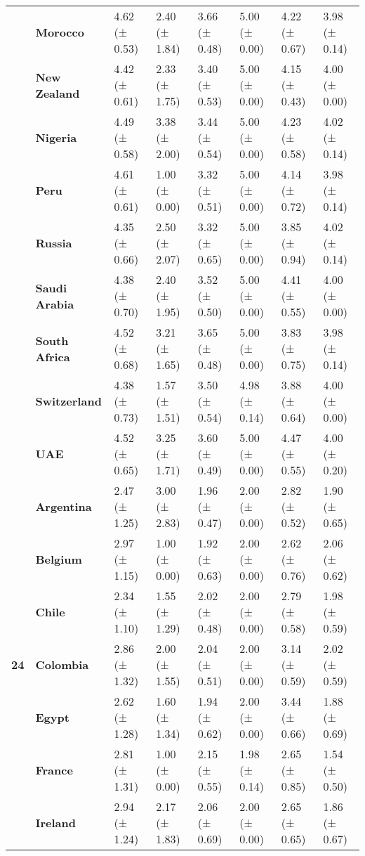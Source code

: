 \begin{longtable}{llllllll}
\textbf{} & \textbf{Morocco} & 4.62 (± 0.53) & 2.40 (± 1.84) & 3.66 (± 0.48) & 5.00 (± 0.00) & 4.22 (± 0.67) & 3.98 (± 0.14) \\
\textbf{} & \textbf{New Zealand} & 4.42 (± 0.61) & 2.33 (± 1.75) & 3.40 (± 0.53) & 5.00 (± 0.00) & 4.15 (± 0.43) & 4.00 (± 0.00) \\
\textbf{} & \textbf{Nigeria} & 4.49 (± 0.58) & 3.38 (± 2.00) & 3.44 (± 0.54) & 5.00 (± 0.00) & 4.23 (± 0.58) & 4.02 (± 0.14) \\
\textbf{} & \textbf{Peru} & 4.61 (± 0.61) & 1.00 (± 0.00) & 3.32 (± 0.51) & 5.00 (± 0.00) & 4.14 (± 0.72) & 3.98 (± 0.14) \\
\textbf{} & \textbf{Russia} & 4.35 (± 0.66) & 2.50 (± 2.07) & 3.32 (± 0.65) & 5.00 (± 0.00) & 3.85 (± 0.94) & 4.02 (± 0.14) \\
\textbf{} & \textbf{Saudi Arabia} & 4.38 (± 0.70) & 2.40 (± 1.95) & 3.52 (± 0.50) & 5.00 (± 0.00) & 4.41 (± 0.55) & 4.00 (± 0.00) \\
\textbf{} & \textbf{South Africa} & 4.52 (± 0.68) & 3.21 (± 1.65) & 3.65 (± 0.48) & 5.00 (± 0.00) & 3.83 (± 0.75) & 3.98 (± 0.14) \\
\textbf{} & \textbf{Switzerland} & 4.38 (± 0.73) & 1.57 (± 1.51) & 3.50 (± 0.54) & 4.98 (± 0.14) & 3.88 (± 0.64) & 4.00 (± 0.00) \\
\textbf{} & \textbf{UAE} & 4.52 (± 0.65) & 3.25 (± 1.71) & 3.60 (± 0.49) & 5.00 (± 0.00) & 4.47 (± 0.55) & 4.00 (± 0.20) \\
\cline{1-8}
\multirow[t]{19}{*}{\textbf{24}} & \textbf{Argentina} & 2.47 (± 1.25) & 3.00 (± 2.83) & 1.96 (± 0.47) & 2.00 (± 0.00) & 2.82 (± 0.52) & 1.90 (± 0.65) \\
\textbf{} & \textbf{Belgium} & 2.97 (± 1.15) & 1.00 (± 0.00) & 1.92 (± 0.63) & 2.00 (± 0.00) & 2.62 (± 0.76) & 2.06 (± 0.62) \\
\textbf{} & \textbf{Chile} & 2.34 (± 1.10) & 1.55 (± 1.29) & 2.02 (± 0.48) & 2.00 (± 0.00) & 2.79 (± 0.58) & 1.98 (± 0.59) \\
\textbf{} & \textbf{Colombia} & 2.86 (± 1.32) & 2.00 (± 1.55) & 2.04 (± 0.51) & 2.00 (± 0.00) & 3.14 (± 0.59) & 2.02 (± 0.59) \\
\textbf{} & \textbf{Egypt} & 2.62 (± 1.28) & 1.60 (± 1.34) & 1.94 (± 0.62) & 2.00 (± 0.00) & 3.44 (± 0.66) & 1.88 (± 0.69) \\
\textbf{} & \textbf{France} & 2.81 (± 1.31) & 1.00 (± 0.00) & 2.15 (± 0.55) & 1.98 (± 0.14) & 2.65 (± 0.85) & 1.54 (± 0.50) \\
\textbf{} & \textbf{Ireland} & 2.94 (± 1.24) & 2.17 (± 1.83) & 2.06 (± 0.69) & 2.00 (± 0.00) & 2.65 (± 0.65) & 1.86 (± 0.67) \\

\end{longtable}

